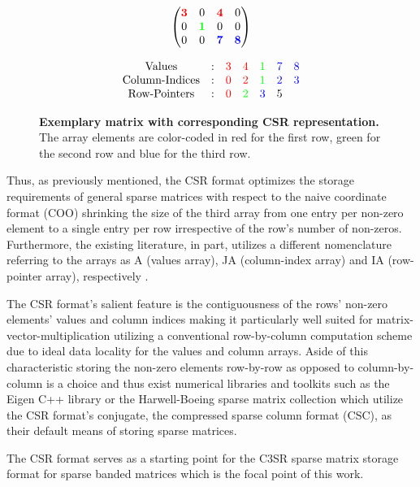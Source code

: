     \begin{figure}[ht]
      \centering
      \begin{minipage}{0.4\textwidth}
        \centering
        $$
        \begin{pmatrix}
          \color{red}{\bm{3}} &                     0 &  \color{red}{\bm{4}} &                    0 \\
                            0 & \color{green}{\bm{1}} &                    0 &                    0 \\
                            0 &                     0 & \color{blue}{\bm{7}} & \color{blue}{\bm{8}} \\
        \end{pmatrix}
        $$
      \end{minipage}
      \begin{minipage}{0.4\textwidth}
        \centering
        $$
        \begin{matrix}
          \text{Values}  & : & \color{red}{3} &   \color{red}{4} & \color{green}{1} & \color{blue}{7} & \color{blue}{8} \\
          \text{Column-Indices} & : & \color{red}{0} &   \color{red}{2} & \color{green}{1} & \color{blue}{2} & \color{blue}{3} \\
          \text{Row-Pointers} & : & \color{red}{0} & \color{green}{2} &  \color{blue}{3} &               5 &                 \\
        \end{matrix}
        $$
      \end{minipage}
      \caption[Exemplary matrix with corresponding CSR representation.]{\textbf{Exemplary matrix with corresponding CSR representation.} The array elements are color-coded in red for the first row, green for the second row and blue for the third row.}
      \label{fig:csr_example}
    \end{figure}

    Thus, as previously mentioned, the CSR format optimizes the storage requirements of general sparse matrices with
    respect to the naive coordinate format (COO) shrinking the size of the third array from one entry per non-zero
    element to a single entry per row irrespective of the row's number of non-zeros. Furthermore, the existing
    literature, in part, utilizes a different nomenclature referring to the arrays as A (values array), JA (column-index
    array) and IA (row-pointer array), respectively \cite{sparskit}.

    The CSR format's salient feature is the contiguousness of the rows' non-zero elements' values and column indices
    making it particularly well suited for matrix-vector-multiplication utilizing a conventional row-by-column
    computation scheme due to ideal data locality for the values and column arrays. Aside of this characteristic storing
    the non-zero elements row-by-row as opposed to column-by-column is a choice and thus exist numerical libraries and
    toolkits such as the Eigen C++ library \cite{eigen:website} or the Harwell-Boeing sparse matrix collection
    \cite{harwell-boeing} which utilize the CSR format's conjugate, the compressed sparse column format (CSC), as their
    default means of storing sparse matrices.

    The CSR format serves as a starting point for the C3SR sparse matrix storage format for sparse banded matrices which
    is the focal point of this work.


